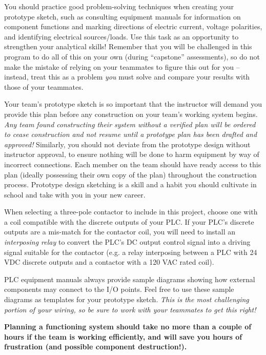 \documentclass[12pt,a4paper]{article}
\begin{document}
\begin{itemize}
You should practice good problem-solving techniques when creating your prototype sketch, such as consulting equipment manuals for information on component functions and marking directions of electric current, voltage polarities, and identifying electrical sources/loads.  Use this task as an opportunity to strengthen your analytical skills!  Remember that you will be challenged in this program to do all of this on your own (during ``capstone'' assessments), so do not make the mistake of relying on your teammates to figure this out for you -- instead, treat this as a problem {\it you} must solve and compare your results with those of your teammates.

Your team's prototype sketch is so important that the instructor will demand you provide this plan before any construction on your team's working system begins.  {\it Any team found constructing their system without a verified plan will be ordered to cease construction and not resume until a prototype plan has been drafted and approved!}  Similarly, you should not deviate from the prototype design without instructor approval, to ensure nothing will be done to harm equipment by way of incorrect connections.  Each member on the team should have ready access to this plan (ideally possessing their own copy of the plan) throughout the construction process.  Prototype design sketching is a skill and a habit you should cultivate in school and take with you in your new career.

\vskip 10pt

When selecting a three-pole contactor to include in this project, choose one with a coil compatible with the discrete outputs of your PLC.  If your PLC's discrete outputs are a mis-match for the contactor coil, you will need to install an {\it interposing relay} to convert the PLC's DC output control signal into a driving signal suitable for the contactor (e.g. a relay interposing between a PLC with 24 VDC discrete outputs and a contactor with a 120 VAC rated coil).

PLC equipment manuals always provide sample diagrams showing how external components may connect to the I/O points.  Feel free to use these sample diagrams as templates for your prototype sketch.  {\it This is the most challenging portion of your wiring, so be sure to work with your teammates to get this right!}

\vskip 10pt

{\bf Planning a functioning system should take no more than a couple of hours if the team is working efficiently, and will save you hours of frustration (and possible component destruction!).}









\end{itemize}
\end{document}
